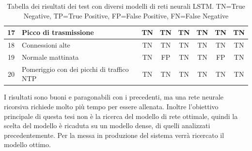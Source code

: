 \begin{table}
\begin{tabularx}{\textwidth}{||c X c c c c c c||}
        \hline
        17 & Picco di trasmissione & TN & TN & TN & TN & TN & TN\\        
        \hline
        18 & Connessioni alte & TN & TN & TN & TN & TN & TN\\
        \hline
        19 & Normale mattinata & TN & \cellcolor{orange} FP & TN & TN & \cellcolor{orange} FP & TN\\ 
        \hline
        20 & Pomeriggio con dei picchi di traffico NTP & TN & TN & TN & TN & TN & TN\\ 
        \hline
    \end{tabularx}
    \caption{Tabella dei risultati dei test con diversi modelli di reti neurali LSTM. TN=True Negative, TP=True Positive,  FP=False Positive,  FN=False Negative}
    \label{table:LSTM_tests}
\end{table}

I risultati sono buoni e paragonabili con i precedenti, ma una rete neurale ricorsiva richiede molto più tempo per essere allenata. Inoltre l'obiettivo principale di questa tesi non è la ricerca del modello di rete ottimale, quindi la scelta del modello è ricaduta su un modello dense, di quelli analizzati precedentemente. Per la messa in produzione del sistema verrà ricercato il modello ottimo.
